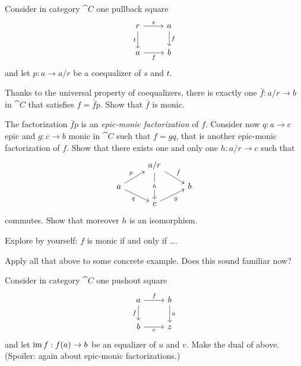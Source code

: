 \begin{exercise}
Consider in category \(\cat C\) one pullback square
\[\begin{tikzcd}
r \ar["s", r] \ar["t", d, swap] & a \ar["f", d] \\
a \ar["f", r, swap] & b
\end{tikzcd}\]
and let \(p : a \to {a}{/}{r}\) be a coequalizer of \(s\) and \(t\).
\begin{tcbenum}
\item Thanks to the universal property of coequalizers, there is exactly one \(\bar f : {a}{/}{r} \to b\) in \(\cat C\) that satisfies \(f = \bar f p\). Show that \(\bar f\) is monic.
\item The factorization \(\bar f p\) is an {\em epic-monic factorization} of \(f\). Consider now \(q : a \to c\) epic and \(g : c \to b\) monic in \(\cat C\) such that \(f = gq\), that is another epic-monic factorization of \(f\). Show that there exists one and only one \(h : {a}{/}{r} \to c\) such that
\[\begin{tikzcd}[row sep=small]
& {a}{/}{r} \ar["h" description, dd] \ar["{\bar f}", dr] & \\
a \ar["p", ur] \ar["q", dr, swap] & & b \\
& c \ar["g", ur, swap]
\end{tikzcd}\]
commutes. Show that moreover \(h\) is an isomorphism.
\item Explore by yourself: \(f\) is monic if and only if \dots{}.
\item Apply all that above to some concrete example. Does this sound familiar now?
\end{tcbenum}
Consider in category \(\cat C\) one pushout square
\[\begin{tikzcd}
a \ar["f", r] \ar["f", d, swap] & b \ar["u", d] \\
b \ar["v", r, swap] & z 
\end{tikzcd}\]
and let \(\operatorname{im} f : f(a) \to b\) be an equalizer of \(u\) and \(v\). Make the dual of above. (Spoiler: again about epic-monic factorizations.)
\end{exercise}

\begin{exercise}
\YetToBeTeXed
\end{exercise}

\begin{exercise}
\YetToBeTeXed
\end{exercise}
